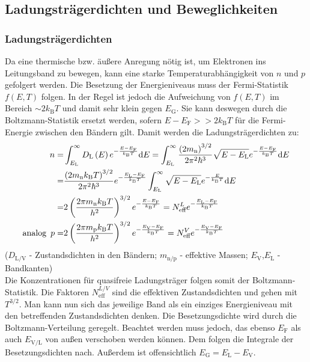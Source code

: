 \documentclass[numbers=noenddot,14pt,a4paper]{scrartcl}
\newcommand{\diff}{\textnormal{d}}
\newcommand{\ix}[1]{_\text{#1}}
\newcommand{\euler}{\mathnormal{e}}
\begin{document}
\subsection{Ladungsträgerdichten und Beweglichkeiten}
\subsubsection{Ladungsträgerdichten}
Da eine thermische  bzw. äußere Anregung nötig ist, um Elektronen ins Leitungsband zu bewegen, kann eine starke Temperaturabhängigkeit von $n$ und $p$ gefolgert werden. Die Besetzung der Energieniveaus muss der Fermi-Statistik $f\left(E,T\right)$ folgen. In der Regel ist jedoch die Aufweichung von $f\left(E,T\right)$ im Bereich $\sim2k\ix{B}T$ und damit sehr klein gegen $E\ix{G}$. Sie kann deswegen durch die Boltzmann-Statistik ersetzt werden, sofern $E-E\ix{F}>>2k\ix{B}T$ für die Fermi-Energie zwischen den Bändern gilt. Damit werden die Ladungsträgerdichten zu:
\begin{align}
	n=&\int_{E\ix{L}}^{\infty}D\ix{L}\left(E\right)\euler^{-\frac{E-E\ix{F}}{k\ix{B}T}}\diff E=\int_{E\ix{L}}^{\infty}\frac{\left(2m\ix{n}\right)^{3/2}}{2\pi^2\hbar^3}\sqrt{E-E\ix{L}}\euler^{-\frac{E-E\ix{F}}{k\ix{B}T}}\diff E \nonumber \\
	=&\frac{\left(2m\ix{n}k\ix{B}T\right)^{3/2}}{2\pi^2\hbar^3}\euler^{-\frac{E\ix{L}-E\ix{F}}{k\ix{B}T}}\int_{E\ix{L}}^{\infty}\sqrt{E-E\ix{L}}\euler^{-\frac{E}{k\ix{B}T}}\diff E \nonumber \\
	=&2\left(\frac{2\pi m\ix{n}k\ix{B}T}{h^2}\right)^{3/2}\euler^{-\frac{E-E\ix{F}}{k\ix{B}T}}=N^L\ix{eff}\euler^{-\frac{E\ix{L}-E\ix{F}}{k\ix{B}T}} \\
	\text{analog} \, \,\, p=&2\left(\frac{2\pi m\ix{p}k\ix{B}T}{h^2}\right)^{3/2}\euler^{-\frac{E\ix{V}-E\ix{F}}{k\ix{B}T}}=N^V\ix{eff}\euler^{-\frac{E\ix{V}-E\ix{F}}{k\ix{B}T}}
\end{align}
($D\ix{L/V}$ - Zustandsdichten in den Bändern; $m\ix{n/p}$ - effektive Massen; $E\ix{V}$,$E\ix{L}$ - Bandkanten)\\
Die Konzentrationen für quasifreie Ladungsträger folgen somit der Boltzmann-Statistik. Die Faktoren $N^{L/V}\ix{eff}$ sind die effektiven Zustandsdichten und gehen mit $T^{3/2}$. Man kann nun sich das jeweilige Band als ein einziges Energieniveau mit den betreffenden Zustandsdichten denken. Die Besetzungsdichte wird durch die Boltzmann-Verteilung geregelt. Beachtet werden muss jedoch, das ebenso $E\ix{F}$ als auch $E\ix{V/L}$ von außen verschoben werden können. Dem folgen die Integrale der Besetzungsdichten nach. Außerdem ist offensichtlich $E\ix{G}=E\ix{L}-E\ix{V}$.\\
\end{document}
